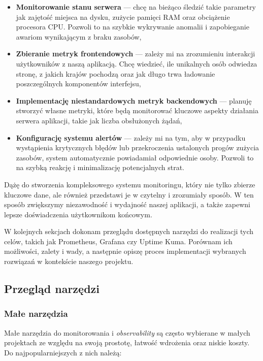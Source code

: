 \documentclass{article}
\begin{document}
\begin{itemize}
    \item \textbf{Monitorowanie stanu serwera} — chcę na bieżąco śledzić takie parametry jak zajętość miejsca na dysku, zużycie pamięci RAM oraz obciążenie procesora CPU. Pozwoli to na szybkie wykrywanie anomalii i zapobieganie awariom wynikającym z braku zasobów,
    \item \textbf{Zbieranie metryk frontendowych} — zależy mi na zrozumieniu interakcji użytkowników z naszą aplikacją. Chcę wiedzieć, ile unikalnych osób odwiedza stronę, z jakich krajów pochodzą oraz jak długo trwa ładowanie poszczególnych komponentów interfejsu,
    \item \textbf{Implementację niestandardowych metryk backendowych} — planuję stworzyć własne metryki, które będą monitorować kluczowe aspekty działania serwera aplikacji, takie jak liczba obsłużonych żądań,
    \item \textbf{Konfigurację systemu alertów} — zależy mi na tym, aby w przypadku wystąpienia krytycznych błędów lub przekroczenia ustalonych progów zużycia zasobów, system automatycznie powiadamiał odpowiednie osoby. Pozwoli to na szybką reakcję i minimalizację potencjalnych strat.
\end{itemize}

Dążę do stworzenia kompleksowego systemu monitoringu, który nie tylko zbierze kluczowe dane, ale również przedstawi je w czytelny i zrozumiały sposób. W ten sposób zwiększymy niezawodność i wydajność naszej aplikacji, a także zapewni lepsze doświadczenia użytkownikom końcowym.

W kolejnych sekcjach dokonam przeglądu dostępnych narzędzi do realizacji tych celów, takich jak Prometheus, Grafana czy Uptime Kuma. Porównam ich możliwości, zalety i wady, a następnie opiszę proces implementacji wybranych rozwiązań w kontekście naszego projektu.

\subsection{Przegląd narzędzi}

\subsubsection{Małe narzędzia}

Małe narzędzia do monitorowania i \textit{observability} są często wybierane w małych projektach ze względu na swoją prostotę, łatwość wdrożenia oraz niskie koszty. Do najpopularniejszych z nich należą:
\end{document}
